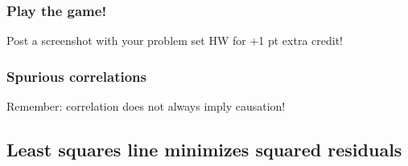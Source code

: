 \documentclass[slidestop,compress,mathserif,12pt,t,professionalfonts,xcolor=table]{beamer}
\begin{document}

\begin{frame}
\frametitle{Play the game!}

\vfill

Post a screenshot with your problem set HW for +1 pt extra credit!


\vfill

\end{frame}


\begin{frame}
\frametitle{Spurious correlations}

\vfill

Remember: correlation does not always imply causation!


\vfill

\end{frame}


\subsection{Least squares line minimizes squared residuals}
\label{mi2}

\end{document}
